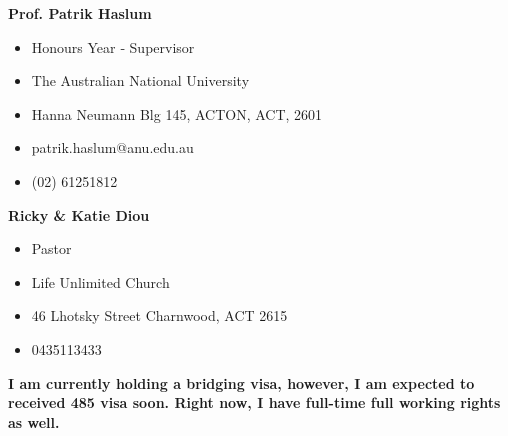 \documentclass[11pt, a4paper]{awesome-cv}
\begin{document}
\begin{cvletter}
\textbf{Prof. Patrik Haslum}
\begin{itemize}
	\item Honours Year ‑ Supervisor
	\item The Australian National University
	\item Hanna Neumann Blg 145, ACTON, ACT, 2601
	\item patrik.haslum@anu.edu.au
	\item (02) 61251812
\end{itemize}

\textbf{Ricky \& Katie Diou}
\begin{itemize}
	\item Pastor
	\item Life Unlimited Church
	\item 46 Lhotsky Street Charnwood, ACT 2615
	\item 0435113433
\end{itemize}


\textbf{I am currently holding a bridging visa, however,  I am expected to received 485 visa soon. Right now, I have full-time full working rights as well.}
\end{cvletter}


\makeletterclosing
\end{document}
